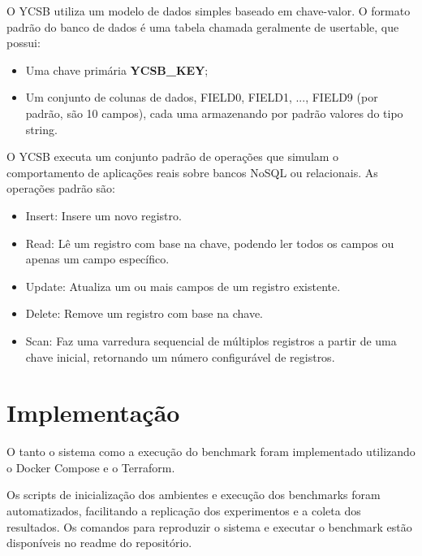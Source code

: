 	O YCSB utiliza um modelo de dados simples baseado em chave-valor. O formato padrão do banco de dados é uma tabela chamada geralmente de usertable, que possui:
    \begin{itemize}
		\item Uma chave primária \textbf{YCSB\_KEY};
		\item Um conjunto de colunas de dados, FIELD0, FIELD1, ..., FIELD9 (por padrão, são 10 campos), cada uma armazenando por padrão valores do tipo string.
	\end{itemize}	

	O YCSB executa um conjunto padrão de operações que simulam o comportamento de aplicações reais sobre bancos NoSQL ou relacionais. As operações padrão são:
	\begin{itemize}
		\item Insert: Insere um novo registro.
		\item Read: Lê um registro com base na chave, podendo ler todos os campos ou apenas um campo específico.
		\item Update: Atualiza um ou mais campos de um registro existente.
		\item Delete: Remove um registro com base na chave.
		\item Scan: Faz uma varredura sequencial de múltiplos registros a partir de uma chave inicial, retornando um número configurável de registros.
	\end{itemize}

\section{Implementação}

O tanto o sistema como a execução do benchmark foram implementado utilizando o Docker Compose e o Terraform.

Os scripts de inicialização dos ambientes e execução dos benchmarks foram automatizados,
facilitando a replicação dos experimentos e a coleta dos resultados. 
Os comandos para reproduzir o sistema e executar o benchmark estão disponíveis no readme do repositório.

